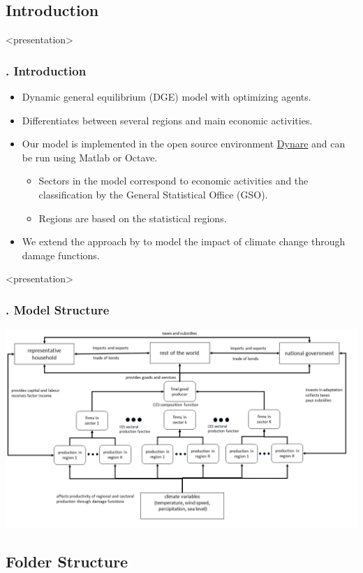 \documentclass[11pt,aspectratio=169]{beamer}
\begin{document}
\subsection{Introduction}
\begin{frame}<presentation>
\frametitle{{\thesection.\thesubsection} Introduction}
\begin{itemize}
\item Dynamic general equilibrium (DGE) model with optimizing agents.
\item Differentiates between several regions and main economic activities.
\item Our model is implemented in the open source environment \href{https://www.dynare.org/}{Dynare} and can be run using Matlab or Octave.
\begin{itemize}
	\item Sectors in the model correspond to economic activities and the classification by the General Statistical Office (GSO).
	\item Regions are based on the statistical regions.
\end{itemize}
\item We extend the approach by \cite{nordhaus1993optimal} to model the impact of climate change through damage functions.
\end{itemize}
\end{frame}

\begin{frame}<presentation>
\frametitle{{\thesection.\thesubsection} Model Structure}
\includegraphics[width = 1\textwidth]{pictures/Model_Structure.png}
\end{frame}


\subsection{Folder Structure}
\end{document}
